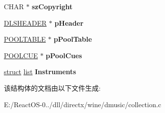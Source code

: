 \begin{DoxyCompactItemize}
C\+H\+AR $\ast$ {\bfseries sz\+Copyright}
\item 
\mbox{\label{struct_i_direct_music_collection_impl_a85478f3a06e1ad30c64b9750d73bb8e7}} 
\hyperlink{struct___d_l_s_h_e_a_d_e_r}{D\+L\+S\+H\+E\+A\+D\+ER} $\ast$ {\bfseries p\+Header}
\item 
\mbox{\label{struct_i_direct_music_collection_impl_a9a6d00b5c76b5a5278fdb500734789ea}} 
\hyperlink{struct___p_o_o_l_t_a_b_l_e}{P\+O\+O\+L\+T\+A\+B\+LE} $\ast$ {\bfseries p\+Pool\+Table}
\item 
\mbox{\label{struct_i_direct_music_collection_impl_a4bdfbe536329fcac6eebdd5db05a8a68}} 
\hyperlink{struct___p_o_o_l_c_u_e}{P\+O\+O\+L\+C\+UE} $\ast$ {\bfseries p\+Pool\+Cues}
\item 
\mbox{\label{struct_i_direct_music_collection_impl_a078646ad6c8288d3ec65bf845969ebe8}} 
\hyperlink{interfacestruct}{struct} \hyperlink{classlist}{list} {\bfseries Instruments}
\end{DoxyCompactItemize}


该结构体的文档由以下文件生成\+:\begin{DoxyCompactItemize}
\item 
E\+:/\+React\+O\+S-\/0../dll/directx/wine/dmusic/collection.\+c\end{DoxyCompactItemize}
